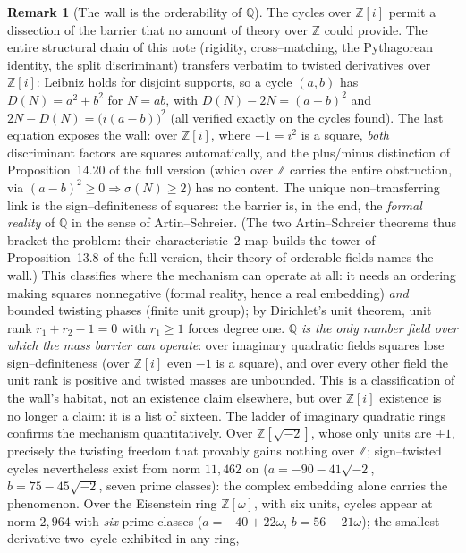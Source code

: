 \documentclass[11pt]{article}
\theoremstyle{definition}
\newtheorem{remark}[theorem]{Remark}
\begin{document}
\begin{remark}[The wall is the orderability of $\mathbb{Q}$]\label{rem:orderable}
The cycles over $\mathbb{Z}[i]$ permit a dissection of the barrier that no amount of theory over
$\mathbb{Z}$ could provide. The entire structural chain of this note (rigidity, cross--matching, the
Pythagorean identity, the split discriminant) transfers verbatim to twisted derivatives over
$\mathbb{Z}[i]$: Leibniz holds for disjoint supports, so a cycle $(a,b)$ has $D(N)=a^2+b^2$ for $N=ab$,
with $D(N)-2N=(a-b)^2$ and $2N-D(N)=\bigl(i(a-b)\bigr)^2$ (all verified exactly on the cycles found).
The last equation exposes the wall: over $\mathbb{Z}[i]$, where $-1=i^2$ is a square, \emph{both}
discriminant factors are squares automatically, and the plus/minus distinction of
Proposition~14.20 of the full version (which over $\mathbb{Z}$ carries the entire obstruction, via
$(a-b)^2\ge0\Rightarrow\sigma(N)\ge2$) has no content. The unique non--transferring link is the
sign--definiteness of squares: the barrier is, in the end, the \emph{formal reality} of $\mathbb{Q}$ in
the sense of Artin--Schreier. (The two Artin--Schreier theorems thus bracket the problem: their
characteristic--$2$ map builds the tower of Proposition~13.8 of the full version, their theory of orderable
fields names the wall.) This classifies where the mechanism can operate at all: it needs an ordering
making squares nonnegative (formal reality, hence a real embedding) \emph{and} bounded twisting phases
(finite unit group); by Dirichlet's unit theorem, unit rank $r_1+r_2-1=0$ with $r_1\ge1$ forces degree
one. \emph{$\mathbb{Q}$ is the only number field over which the mass barrier can operate}: over
imaginary quadratic fields squares lose sign--definiteness (over $\mathbb{Z}[i]$ even $-1$ is a square),
and over every other field the unit rank is positive and twisted masses are unbounded. This is a
classification of the wall's habitat, not an existence claim elsewhere, but over $\mathbb{Z}[i]$
existence is no longer a claim: it is a list of sixteen. The ladder of imaginary quadratic rings
confirms the mechanism quantitatively. Over $\mathbb{Z}[\sqrt{-2}]$, whose only units are $\pm1$,
precisely the twisting freedom that provably gains nothing over $\mathbb{Z}$; sign--twisted cycles
nevertheless exist from norm $11{,}462$ on ($a=-90-41\sqrt{-2}$, $b=75-45\sqrt{-2}$, seven prime
classes): the complex embedding alone carries the phenomenon. Over the Eisenstein ring
$\mathbb{Z}[\omega]$, with six units, cycles appear at norm $2{,}964$ with \emph{six} prime classes
($a=-40+22\omega$, $b=56-21\omega$); the smallest derivative two--cycle exhibited in any ring,

\end{remark}
\end{document}
